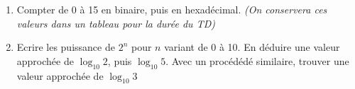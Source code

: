 \documentclass[a4paper,11pt]{article}
\begin{document}
\begin{enumerate}
\item{Compter de 0 à 15 en binaire, puis en hexadécimal. {\it (On conservera ces valeurs dans un tableau pour la durée du TD)}}
%

\item{Ecrire les puissance de $2^n$ pour $n$ variant de 0 à 10. En déduire une valeur approchée de $\log_{10} 2$, puis $\log_{10} 5$. Avec un procédédé similaire, trouver une valeur approchée de $\log_{10} 3$}


\end{enumerate}
\end{document}
